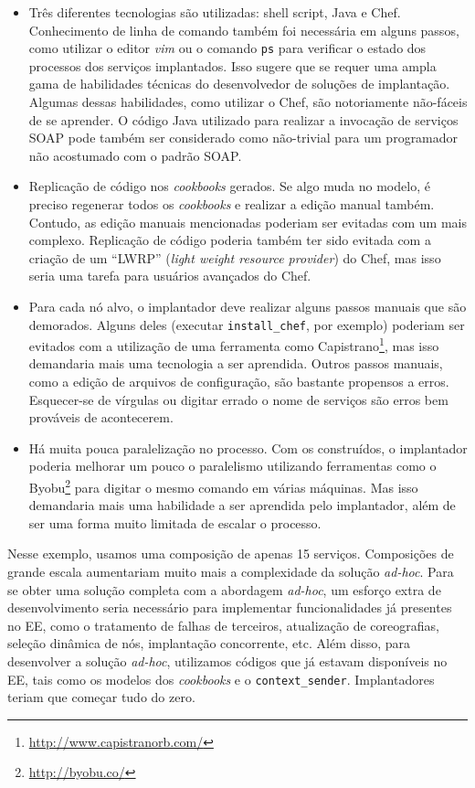 \begin{itemize}

\item Três diferentes tecnologias são utilizadas:
shell script, Java e Chef.
Conhecimento de linha de comando também foi necessária em alguns passos,
como utilizar o editor \emph{vim} ou o comando \texttt{ps} para verificar
o estado dos processos dos serviços implantados.
Isso sugere que se requer uma ampla gama de habilidades técnicas
do desenvolvedor de soluções de implantação.
Algumas dessas habilidades, como utilizar o Chef,
são notoriamente não-fáceis de se aprender.
O código Java utilizado para realizar a invocação de serviços SOAP
pode também ser considerado como não-trivial para um programador
não acostumado com o padrão SOAP.

\item Replicação de código nos \emph{cookbooks} gerados.
Se algo muda no modelo, é preciso regenerar todos os \emph{cookbooks}
e realizar a edição manual também.
Contudo, as edição manuais mencionadas
poderiam ser evitadas com um \script mais complexo.
Replicação de código poderia também ter sido evitada com a criação de um
``LWRP'' (\emph{light weight resource provider}) do Chef,
mas isso seria uma tarefa para usuários avançados do Chef.

\item Para cada nó alvo, o implantador deve realizar alguns passos manuais
que são demorados. Alguns deles (executar \texttt{install\_chef}, por exemplo)
poderiam ser evitados com a utilização de uma ferramenta como
Capistrano\footnote{\url{http://www.capistranorb.com/}},
mas isso demandaria mais uma tecnologia a ser aprendida.
Outros passos manuais, como a edição de arquivos de configuração, 
são bastante propensos a erros.
Esquecer-se de vírgulas ou digitar errado o nome de serviços
são erros bem prováveis de acontecerem.

\item Há muita pouca paralelização no processo.
Com os \scripts construídos, o implantador poderia melhorar
um pouco o paralelismo utilizando ferramentas como o
Byobu\footnote{\url{http://byobu.co/}} 
para digitar o mesmo comando em várias máquinas.
Mas isso demandaria mais uma habilidade a ser aprendida pelo implantador,
além de ser uma forma muito limitada de escalar o processo.

\end{itemize}

Nesse exemplo, usamos uma composição de apenas 15 serviços.
Composições de grande escala aumentariam muito mais a complexidade da
solução \emph{ad-hoc}.
Para se obter uma solução completa com a abordagem \emph{ad-hoc},
um esforço extra de desenvolvimento seria necessário
para implementar funcionalidades já presentes no EE,
como o tratamento de falhas de terceiros,
atualização de coreografias, seleção dinâmica de nós,
implantação concorrente, etc.
Além disso, para desenvolver a solução \emph{ad-hoc},
utilizamos códigos que já estavam disponíveis no EE,
tais como os modelos dos \emph{cookbooks} e o \texttt{context\_sender}.
Implantadores teriam que começar tudo do zero.

